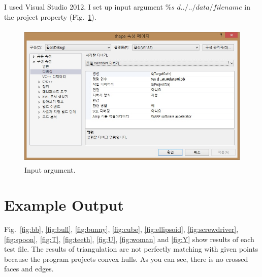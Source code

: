 \documentclass[11pt]{article}
\begin{document}
I used Visual Studio 2012. I set up input argument $\%s$  $d ../../data/filename$ in the project property (Fig.~\ref{fig:input}).     

\begin{figure}[!htb]
\centering
\includegraphics[height=7cm]{./figs/input.jpg}
\caption{Input argument.}
\label{fig:input}
\end{figure} 

\section{Example Output}

Fig.~\ref{fig:bb}, \ref{fig:bull}, \ref{fig:bunny}, \ref{fig:cube}, \ref{fig:ellipsoid}, \ref{fig:screwdriver}, \ref{fig:spoon}, \ref{fig:T}, \ref{fig:teeth}, \ref{fig:U}, \ref{fig:woman} and \ref{fig:Y} show results of each test file. The results of triangulation are not perfectly matching with given points because the program projects convex hulls. As you can see, there is no crossed faces and edges.
\end{document}

